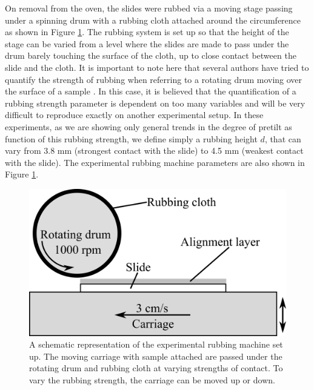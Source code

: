 On removal from the oven, the slides were rubbed via a moving stage passing under a spinning drum with a rubbing cloth attached around the circumference as shown in Figure \ref{fig:rubbingmachine}. The rubbing system is set up so that the height of the stage can be varied from a level where the slides are made to pass under the drum barely touching the surface of the cloth, up to close contact between the slide and the cloth. It is important to note here that several authors have tried to quantify the strength of rubbing when referring to a rotating drum moving over the surface of a sample \cite{Wang2007, Huang2005,Vaughn2007,Pidduck1996}. In this case, it is believed that the quantification of a rubbing strength parameter is dependent on too many variables and will be very difficult to reproduce exactly on another experimental setup. In these experiments, as we are showing only general trends in the degree of pretilt as function of this rubbing strength, we define simply a rubbing height $d$, that can vary from 3.8 mm (strongest contact with the slide) to 4.5 mm (weakest contact with the slide). The experimental rubbing machine parameters are also shown in Figure \ref{fig:rubbingmachine}.

\begin{figure}
\begin{center}
\includegraphics{Figures/Pretilt/rubbing_machine}
\end{center}
\caption[Schematic diagram of rubbing machine]{\label{fig:rubbingmachine}A schematic representation of the experimental rubbing machine set up. The moving carriage with sample attached are passed under the rotating drum and rubbing cloth at varying strengths of contact. To vary the rubbing strength, the carriage can be moved up or down.}
\end{figure}


